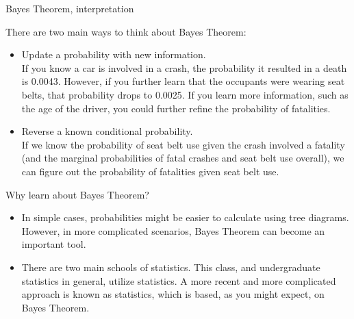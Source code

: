 \documentclass[xcolor=table, aspectratio=169, bigger]{beamer}
\begin{document}
\begin{frame}{Bayes Theorem, interpretation}
\begin{block}{}
There are two main ways to think about Bayes Theorem:

\begin{itemize}
\pause\item Update a probability with new information.\\ \smallskip
If you know a car is involved in a crash, the probability it resulted in a death is 0.0043. However, if you further learn that the occupants were wearing seat belts, that probability drops to 0.0025. If you learn more information, such as the age of the driver, you could further refine the probability of fatalities.

\pause\item Reverse a known conditional probability.\\ \smallskip
If we know the probability of seat belt use given the crash involved a fatality (and the marginal probabilities of fatal crashes and seat belt use overall), we can figure out the probability of fatalities given seat belt use.
\end{itemize}
\end{block}
\end{frame}

\begin{frame}{Why learn about Bayes Theorem?}
\begin{block}{}
\begin{itemize}
\item In simple cases, probabilities might be easier to calculate using tree diagrams. However, in more complicated scenarios, Bayes Theorem can become an important tool.

\pause\item There are two main schools of statistics. This class, and undergraduate statistics in general, utilize  statistics. A more recent and more complicated approach is known as  statistics, which is based, as you might expect, on Bayes Theorem. 
\end{itemize}
\end{block}
\end{frame}
\end{document}
